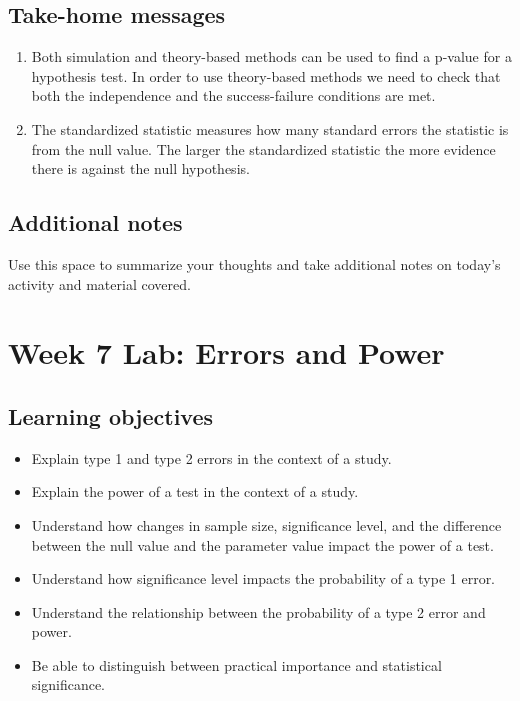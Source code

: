 \documentclass[
]{report}
\begin{document}
\hypertarget{take-home-messages-10}{%
\subsection{Take-home messages}\label{take-home-messages-10}}

\begin{enumerate}
\def\labelenumi{\arabic{enumi}.}
\item
  Both simulation and theory-based methods can be used to find a p-value for a hypothesis test. In order to use theory-based methods we need to check that both the independence and the success-failure conditions are met.
\item
  The standardized statistic measures how many standard errors the statistic is from the null value. The larger the standardized statistic the more evidence there is against the null hypothesis.
\end{enumerate}

\hypertarget{additional-notes-10}{%
\subsection{Additional notes}\label{additional-notes-10}}

Use this space to summarize your thoughts and take additional notes on today's activity and material covered.

\newpage

\hypertarget{week-7-lab-errors-and-power}{%
\section{Week 7 Lab: Errors and Power}\label{week-7-lab-errors-and-power}}


\hypertarget{learning-objectives-9}{%
\subsection{Learning objectives}\label{learning-objectives-9}}

\begin{itemize}
\item
  Explain type 1 and type 2 errors in the context of a study.
\item
  Explain the power of a test in the context of a study.
\item
  Understand how changes in sample size, significance level, and the difference between the null value and the parameter value impact the power of a test.
\item
  Understand how significance level impacts the probability of a type 1 error.
\item
  Understand the relationship between the probability of a type 2 error and power.
\item
  Be able to distinguish between practical importance and statistical significance.
\end{itemize}
\end{document}
